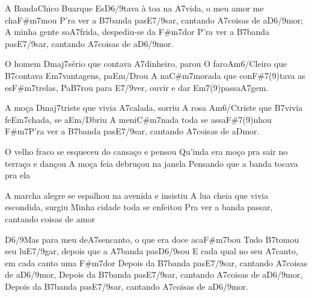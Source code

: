 \begin{musica}{A Banda}{Chico Buarque}{}
Es\ac{D6/9}{ta}va à toa na \ac{A7}{vi}da, o meu amor me cha\ac{F#m7}{mou}
P’ra ver a \ac{B7}{ban}da pas\ac{E7/9}{sar}, cantando \ac{A7}{coi}sas de a\ac{D6/9}{mor};
A minha gente so\ac{A7}{fri}da, despediu-se da \ac{F#m7}{dor}
P’ra ver a \ac{B7}{ban}da pas\ac{E7/9}{sar}, cantando \ac{A7}{coi}sas de a\ac{D6/9}{mor}.

O homem \ac{Dmaj7}{sé}rio que contava \ac{A7}{di}nheiro, parou
O faro\ac{Am6/C}{lei}ro que \ac{B7}{con}tava \ac{Em7}{van}tagens, pa\ac{Em/D}{rou}
A na\ac{C#m7}{mo}rada que con\ac{F#7(9)}{ta}va as es\ac{F#m7}{tre}las,
Pa\ac{B7}{rou} para \ac{E7/9}{ver}, ouvir e dar \ac{Em7(9)}{pa}ssa\ac{A7}{gem}.

A moça \ac{Dmaj7}{tris}te que vivia \ac{A7}{ca}lada, sorriu
A rosa \ac{Am6/C}{tris}te que \ac{B7}{vi}via fe\ac{Em7}{cha}da, se a\ac{Em/D}{briu}
A meni\ac{C#m7}{na}da toda se assa\ac{F#7(9)}{nhou}
\ac{F#m7}{P’ra} ver a \ac{B7}{ban}da pas\ac{E7/9}{sar}, cantando \ac{A7}{coi}sas de a\ac{D}{mor}.


O velho fraco se esqueceu do cansaço e pensou
Qu'inda era moço pra sair no terraço e dançou
A moça feia debruçou na janela
Pensando que a banda tocava pra ela

A marcha alegre se espalhou na avenida e insistiu
A lua cheia que vivia escondida, surgiu
Minha cidade toda se enfeitou
Pra ver a banda passar, cantando coisas de amor

\ac{D6/9}{Mas} para meu de\ac{A7}{sen}canto, o que era doce aca\ac{F#m7}{bou}
Tudo \ac{B7}{to}mou seu lu\ac{E7/9}{gar}, depois que a \ac{A7}{ban}da pas\ac{D6/9}{sou}
E cada qual no seu \ac{A7}{can}to, em cada canto uma \ac{F#m7}{dor}
Depois da \ac{B7}{ban}da pas\ac{E7/9}{sar}, cantando \ac{A7}{coi}sas de a\ac{D6/9}{mor},
Depois da \ac{B7}{ban}da pas\ac{E7/9}{sar}, cantando \ac{A7}{coi}sas de a\ac{D6/9}{mor},
Depois da \ac{B7}{ban}da pas\ac{E7/9}{sar}, cantando \ac{A7}{coi}sas de a\ac{D6/9}{mor}.

\end{musica}

